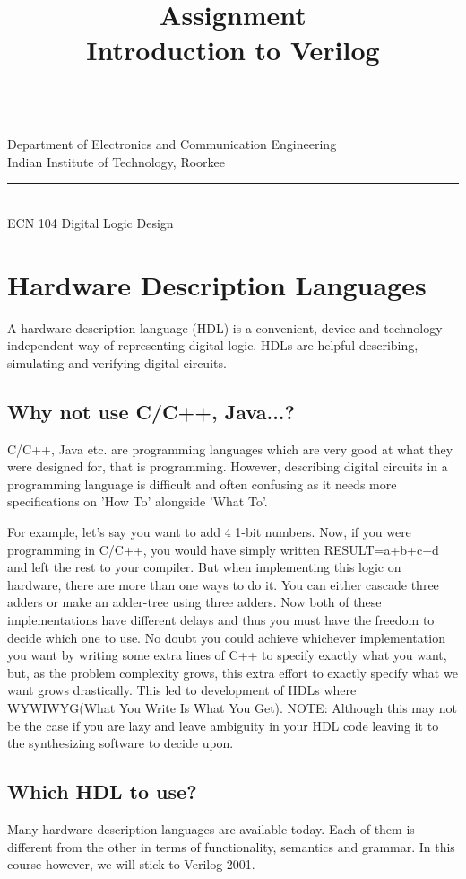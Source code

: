 \documentclass[a4paper,10pt]{article}
\makeatletter
\newcommand{\linia}{\rule{\linewidth}{0.5pt}}
\newcommand{\ano}{\text{1}}
\theoremstyle{mytheor}
\renewcommand{\maketitle}{
\begin{center}
\vspace{2ex}
{\huge \textsc{\@title}}
\vspace{1ex}
\\
Department of Electronics and Communication Engineering \\
Indian Institute of Technology, Roorkee
\linia\\
ECN 104 \hfill Digital Logic Design
\vspace{4ex}
\end{center}
}
\makeatother
\begin{document}
\title{Assignment \ano \\ Introduction to Verilog}

\maketitle

\section*{Hardware Description Languages}
A hardware description language (HDL) is a convenient, device and
technology independent way of representing digital logic. HDLs are
helpful describing, simulating and verifying digital circuits.

\subsection*{Why not use C/C++, Java...?} 
C/C++, Java etc. are programming languages which are very good at what
they were designed for, that is programming. However, describing
digital circuits in a programming language is difficult and often
confusing as it needs more specifications on 'How To' alongside 'What
To'.

For example, let's say you want to add 4 1-bit numbers. Now, if you
were programming in C/C++, you would have simply written
RESULT=a+b+c+d and left the rest to your compiler. But when
implementing this logic on hardware, there are more than one ways to
do it. You can either cascade three adders or make an adder-tree using
three adders. Now both of these implementations have different delays
and thus you must have the freedom to decide which one to use. No
doubt you could achieve whichever implementation you want by writing
some extra lines of C++ to specify exactly what you want, but, as the
problem complexity grows, this extra effort to exactly specify what we
want grows drastically. This led to development of HDLs where
WYWIWYG(What You Write Is What You Get). NOTE: Although this may not
be the case if you are lazy and leave ambiguity in your HDL code
leaving it to the synthesizing software to decide upon.

\subsection*{Which HDL to use?}
Many hardware description languages are available today. Each of them
is different from the other in terms of functionality, semantics and
grammar. In this course however, we will stick to Verilog 2001.
\end{document}
